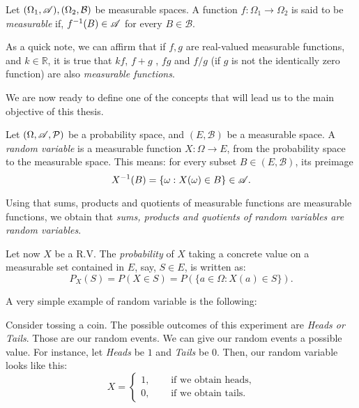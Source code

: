 \begin{ndef}
Let $(\Omega_1, \mathscr{A}),(\Omega_2, \mathcal B)$ be measurable spaces. A function $f: \Omega_1 \to \Omega_2$ is said to be \emph{measurable} if, $f^{-1}(B) \in \mathscr{A}$ for every $B \in \mathcal B$.
\end{ndef}

As a quick note, we can affirm that if $f,g$ are real-valued measurable functions, and $k \in \mathbb R$, it is true that $kf$, $f+g$ , $fg$ and $f/g$ (if $g$ is not the identically zero function) are also \emph{measurable functions}.

We are now ready to define one of the concepts that will lead us to the main objective of this thesis.

\begin{ndef}
Let $(\Omega,\mathscr{A},\mathcal{P})$ be a probability space, and $(E,\mathcal B)$ be a measurable space. 
A \emph{random variable} is a measurable function $X: \Omega \to E$, from the probability space to the measurable space. This means: for every subset $B \in (E,\mathcal B)$, its preimage
$$
X^{-1}(B) = \{\omega : X(\omega) \in B\} \in \mathscr{A} .
$$
\end{ndef}

Using that sums, products and quotients of measurable functions are measurable functions, we obtain that \emph{sums, products and quotients of random variables are random variables}.

Let now $X$ be a R.V. The \emph{probability} of $X$ taking a concrete value on a measurable set contained in $E$, say, $S \in E$, is written as:
$$
P_X(S) = P(X \in S) = P(\{a \in \Omega : X(a) \in S\}).
$$

A very simple example of random variable is the following:

\begin{nexample}
  Consider tossing a coin. The possible outcomes of this experiment are \emph{Heads or Tails}. Those are our random events. We can give our random events a possible value. 
  For instance, let \emph{Heads} be $1$ and \emph{Tails} be $0$. Then, our random variable looks like this:
  \begin{equation*}
      X  = \left\{ \begin{aligned}
  1, \quad & \text{ if we obtain heads,} \\
  0, \quad & \text{ if we obtain tails.}
\end{aligned}\right.
  \end{equation*}

\end{nexample}

